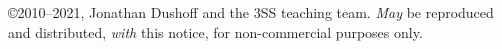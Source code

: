 \copyright 2010--2021, Jonathan Dushoff and the 3SS teaching team.  \emph{May} be reproduced and distributed, \emph{with} this notice, for non-commercial purposes only.
